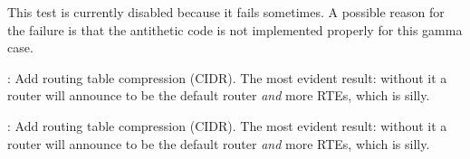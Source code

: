 \begin{DoxyRefList}
This test is currently disabled because it fails sometimes. A possible reason for the failure is that the antithetic code is not implemented properly for this gamma case.  
\item[\label{todo__todo000061}%
\hypertarget{todo__todo000061}{}%
Module \hyperlink{group__rip}{rip} ]\+: Add routing table compression (C\+I\+DR). The most evident result\+: without it a router will announce to be the default router {\itshape and} more R\+T\+Es, which is silly.  
\item[\label{todo__todo000062}%
\hypertarget{todo__todo000062}{}%
Module \hyperlink{group__ripng}{ripng} ]\+: Add routing table compression (C\+I\+DR). The most evident result\+: without it a router will announce to be the default router {\itshape and} more R\+T\+Es, which is silly. 
\end{DoxyRefList}